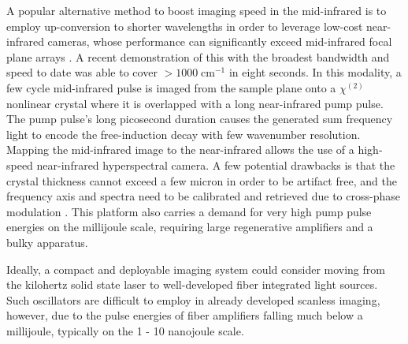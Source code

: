 \documentclass{optica-article}
\begin{document}

A popular alternative method to boost imaging speed in the mid-infrared is to employ up-conversion to shorter wavelengths in order to leverage low-cost near-infrared cameras, whose performance can significantly exceed mid-infrared focal plane arrays \cite{junaidVideorateMidinfraredHyperspectral2019,knezInfraredChemicalImaging2020,potmaRapidChemicallySelective2021}. A recent demonstration of this with the broadest bandwidth and speed to date was able to cover \mbox{$>$$1000 \; \mathrm{cm^{-1}}$} \cite{zhaoHighspeedScanlessEntire2023} in eight seconds. In this modality, a few cycle mid-infrared pulse is imaged from the sample plane onto a $\chi^{(2)}$ nonlinear crystal where it is overlapped with a long near-infrared pump pulse. The pump pulse's long picosecond duration causes the generated sum frequency light to encode the free-induction decay with few wavenumber resolution. Mapping the mid-infrared image to the near-infrared allows the use of a high-speed near-infrared hyperspectral camera. A few potential drawbacks is that the crystal thickness cannot exceed a few micron in order to be artifact free, and the frequency axis and spectra need to be calibrated and retrieved due to cross-phase modulation \cite{leeRemovingCrossphaseModulation2009}. This platform also carries a demand for very high pump pulse energies on the millijoule scale, requiring large regenerative amplifiers and a bulky apparatus.



Ideally, a compact and deployable imaging system could consider moving from the kilohertz solid state laser to well-developed fiber integrated light sources. Such oscillators are difficult to employ in already developed scanless imaging, however, due to the pulse energies of fiber amplifiers falling much below a millijoule, typically on the 1 - 10 nanojoule scale. 
\end{document}
